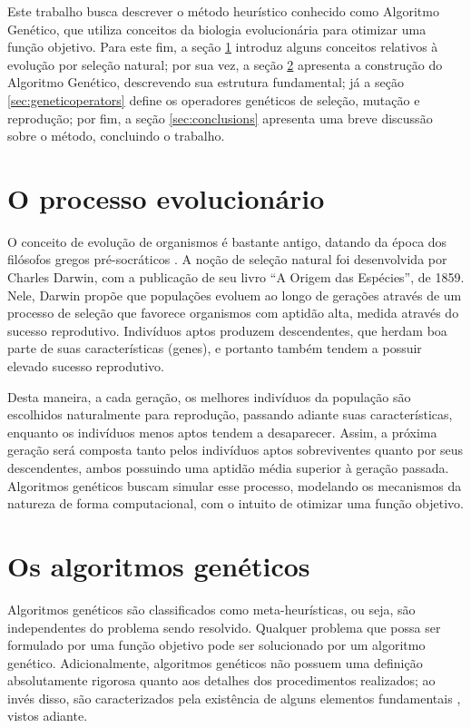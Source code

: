 \documentclass[12pt]{article}
\begin{document}
Este trabalho busca descrever o método heurístico conhecido como Algoritmo Genético, que utiliza conceitos da biologia evolucionária para otimizar uma função objetivo. Para este fim, a seção \ref{sec:introevolution} introduz alguns conceitos relativos à evolução por seleção natural; por sua vez, a seção \ref{sec:algorithm} apresenta a construção do Algoritmo Genético, descrevendo sua estrutura fundamental; já a seção \ref{sec:geneticoperators} define os operadores genéticos de seleção, mutação e reprodução; por fim, a seção \ref{sec:conclusions} apresenta uma breve discussão sobre o método, concluindo o trabalho.

\section{O processo evolucionário} \label{sec:introevolution}

O conceito de evolução de organismos é bastante antigo, datando da época dos filósofos gregos pré-socráticos \cite{Hull1967}. A noção de seleção natural  foi desenvolvida por Charles Darwin, com a publicação de seu livro ``A Origem das Espécies'', de 1859. Nele, Darwin propõe que populações evoluem ao longo de gerações através de um processo de seleção que favorece organismos com aptidão alta, medida através do sucesso reprodutivo. Indivíduos aptos produzem descendentes, que herdam boa parte de suas características (genes), e portanto também tendem a possuir elevado sucesso reprodutivo.

Desta maneira, a cada geração, os melhores indivíduos da população são escolhidos naturalmente para reprodução, passando adiante suas características, enquanto os indivíduos menos aptos tendem a desaparecer. Assim, a próxima geração será composta tanto pelos indivíduos aptos sobreviventes quanto por seus descendentes, ambos possuindo uma aptidão média superior à geração passada. Algoritmos genéticos buscam simular esse processo, modelando os mecanismos da natureza de forma computacional, com o intuito de otimizar uma função objetivo.

\section{Os algoritmos genéticos} \label{sec:algorithm}

Algoritmos genéticos são classificados como meta-heurísticas, ou seja, são independentes do problema sendo resolvido. Qualquer problema que possa ser formulado por uma função objetivo pode ser solucionado por um algoritmo genético. Adicionalmente, algoritmos genéticos não possuem uma definição absolutamente rigorosa quanto aos detalhes dos procedimentos realizados; ao invés disso, são caracterizados pela existência de alguns elementos fundamentais \cite{Mitchell1998}, vistos adiante.
\end{document}
